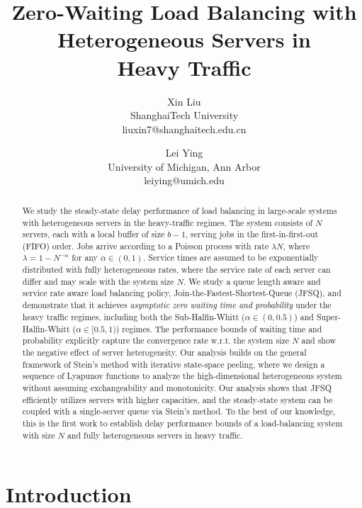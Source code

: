 \documentclass[11pt,oneside,letter]{article}
\title{Zero-Waiting Load Balancing with Heterogeneous Servers in \\
Heavy Traffic}
\author{Xin Liu \\ShanghaiTech University \\ liuxin7@shanghaitech.edu.cn
\and Lei Ying \\University of Michigan, Ann Arbor \\ leiying@umich.edu}
\date{}
\begin{document}
\maketitle

\begin{abstract}
We study the steady-state delay performance of load balancing in large-scale systems with heterogeneous servers in the heavy-traffic regimes. The system consists of $N$ servers, each with a local buffer of size $b-1$, serving jobs in the first-in-first-out (FIFO) order. Jobs arrive according to a Poisson process with rate $\lambda N$, where $\lambda = 1 - N^{-\alpha}$ for any $\alpha \in (0,1)$. Service times are assumed to be exponentially distributed with fully heterogeneous rates, where the service rate of each server can differ and may scale with the system size $N$.
We study a queue length aware and service rate aware load balancing policy, Join-the-Fastest-Shortest-Queue (JFSQ), and demonstrate that it achieves {\it asymptotic zero waiting time and probability} under the heavy traffic regimes, including both the Sub-Halfin-Whitt ($\alpha \in (0,0.5)$) and Super-Halfin-Whitt ($\alpha \in [0.5,1)$) regimes. The performance bounds of waiting time and probability explicitly capture the convergence rate w.r.t. the system size $N$ and show the negative effect of server heterogeneity. 
Our analysis builds on the general framework of Stein’s method with iterative state-space peeling, where we design a sequence of 
Lyapunov functions to analyze the high-dimensional heterogeneous system without assuming exchangeability and monotonicity.  
Our analysis shows that JFSQ efficiently utilizes servers with higher capacities, and the steady-state system can be coupled with a single-server queue via Stein's method. 
To the best of our knowledge, this is the first work to establish  delay performance bounds of a load-balancing system with size $N$ and fully heterogeneous servers in heavy traffic. 
\end{abstract}

\section{Introduction}
\end{document}
